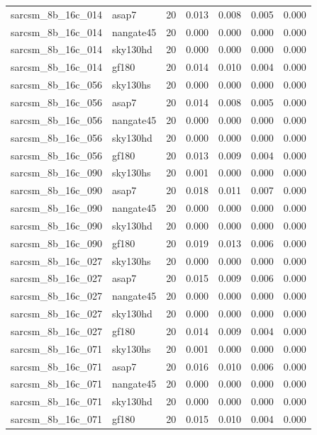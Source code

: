 \begin{tabular}{llrrrrr}
sarcsm\_8b\_16c\_014 & asap7 & 20 & 0.013 & 0.008 & 0.005 & 0.000 \\
sarcsm\_8b\_16c\_014 & nangate45 & 20 & 0.000 & 0.000 & 0.000 & 0.000 \\
sarcsm\_8b\_16c\_014 & sky130hd & 20 & 0.000 & 0.000 & 0.000 & 0.000 \\
sarcsm\_8b\_16c\_014 & gf180 & 20 & 0.014 & 0.010 & 0.004 & 0.000 \\
sarcsm\_8b\_16c\_056 & sky130hs & 20 & 0.000 & 0.000 & 0.000 & 0.000 \\
sarcsm\_8b\_16c\_056 & asap7 & 20 & 0.014 & 0.008 & 0.005 & 0.000 \\
sarcsm\_8b\_16c\_056 & nangate45 & 20 & 0.000 & 0.000 & 0.000 & 0.000 \\
sarcsm\_8b\_16c\_056 & sky130hd & 20 & 0.000 & 0.000 & 0.000 & 0.000 \\
sarcsm\_8b\_16c\_056 & gf180 & 20 & 0.013 & 0.009 & 0.004 & 0.000 \\
sarcsm\_8b\_16c\_090 & sky130hs & 20 & 0.001 & 0.000 & 0.000 & 0.000 \\
sarcsm\_8b\_16c\_090 & asap7 & 20 & 0.018 & 0.011 & 0.007 & 0.000 \\
sarcsm\_8b\_16c\_090 & nangate45 & 20 & 0.000 & 0.000 & 0.000 & 0.000 \\
sarcsm\_8b\_16c\_090 & sky130hd & 20 & 0.000 & 0.000 & 0.000 & 0.000 \\
sarcsm\_8b\_16c\_090 & gf180 & 20 & 0.019 & 0.013 & 0.006 & 0.000 \\
sarcsm\_8b\_16c\_027 & sky130hs & 20 & 0.000 & 0.000 & 0.000 & 0.000 \\
sarcsm\_8b\_16c\_027 & asap7 & 20 & 0.015 & 0.009 & 0.006 & 0.000 \\
sarcsm\_8b\_16c\_027 & nangate45 & 20 & 0.000 & 0.000 & 0.000 & 0.000 \\
sarcsm\_8b\_16c\_027 & sky130hd & 20 & 0.000 & 0.000 & 0.000 & 0.000 \\
sarcsm\_8b\_16c\_027 & gf180 & 20 & 0.014 & 0.009 & 0.004 & 0.000 \\
sarcsm\_8b\_16c\_071 & sky130hs & 20 & 0.001 & 0.000 & 0.000 & 0.000 \\
sarcsm\_8b\_16c\_071 & asap7 & 20 & 0.016 & 0.010 & 0.006 & 0.000 \\
sarcsm\_8b\_16c\_071 & nangate45 & 20 & 0.000 & 0.000 & 0.000 & 0.000 \\
sarcsm\_8b\_16c\_071 & sky130hd & 20 & 0.000 & 0.000 & 0.000 & 0.000 \\
sarcsm\_8b\_16c\_071 & gf180 & 20 & 0.015 & 0.010 & 0.004 & 0.000 \\

\end{tabular}
